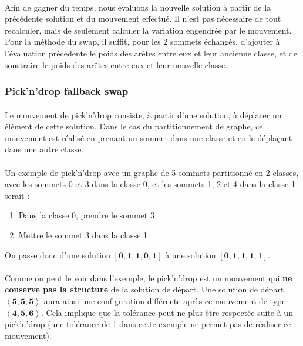 \documentclass[12pt]{article}
\begin{document}
\paragraph{}Afin de gagner du temps, nous évaluons la nouvelle solution à partir de la précédente solution et du mouvement effectué. Il n'est pas nécessaire de tout recalculer, mais de seulement calculer la variation engendrée par le mouvement. Pour la méthode du swap, il suffit, pour les 2 sommets échangés, d'ajouter à l'évaluation précédente le poids des arêtes entre eux et leur ancienne classe, et de soustraire le poids des arêtes entre eux et leur nouvelle classe.

\subsubsection{Pick'n'drop fallback swap}

\paragraph{}Le mouvement de pick'n'drop consiste, à partir d'une solution, à déplacer un élément de cette solution. Dans le cas du partitionnement de graphe, ce mouvement est réalisé en prenant un sommet dans une classe et en le déplaçant dans une autre classe.

\paragraph{}Un exemple de pick'n'drop avec un graphe de 5 sommets partitionné en 2 classes, avec les sommets 0 et 3 dans la classe 0, et les sommets 1, 2 et 4 dans la classe 1 serait :
\begin{enumerate}
	\item Dans la classe 0, prendre le sommet 3
	\item Mettre le sommet 3 dans la classe 1
\end{enumerate}
On passe donc d'une solution $\mathbf{[0,1,1,0,1]}$ à une solution $\mathbf{[0,1,1,1,1]}$.

\paragraph{}Comme on peut le voir dans l'exemple, le pick'n'drop est un mouvement qui \textbf{ne conserve pas la structure} de la solution de départ. Une solution de départ $\mathbf{\left\langle 5,5,5 \right\rangle}$ aura ainsi une configuration différente après ce mouvement de type $\mathbf{\left\langle 4,5,6 \right\rangle}$. Cela implique que la tolérance peut ne plus être respectée suite à un pick'n'drop (une tolérance de 1 dans cette exemple ne permet pas de réaliser ce mouvement).
\end{document}
